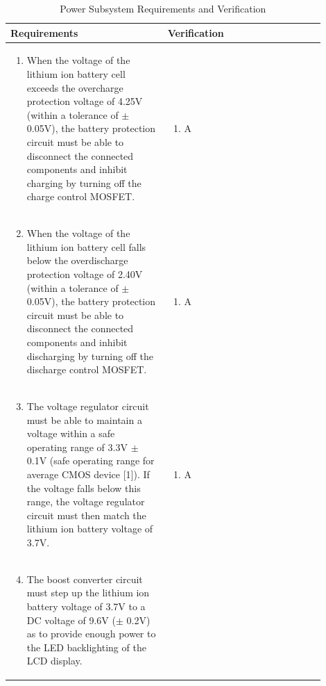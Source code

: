 \documentclass[12pt]{article}
\begin{document}
\begin{table}[!h]
	\caption{Power Subsystem Requirements and Verification}
	\label{tab:p}
	\centering
	\begin{tabular}{| p{0.45\linewidth} | p{0.45\linewidth} |} 
 		\hline
 		\textbf{Requirements} & \textbf{Verification} \\ 
 		\hline
 		\begin{enumerate}
 			\item When the voltage of the lithium ion battery cell exceeds the overcharge protection voltage of 4.25V (within a tolerance of $\pm$0.05V), the battery protection circuit must be able to disconnect the connected components and inhibit charging by turning off the charge control MOSFET. 
		\end{enumerate} & \begin{enumerate}[label=\alph*)]
 			\item A
		\end{enumerate} \\
		\hline
		\begin{enumerate}
		\setcounter{enumi}{1}
 			\item When the voltage of the lithium ion battery cell falls below the overdischarge protection voltage of 2.40V (within a tolerance of $\pm$0.05V), the battery protection circuit must be able to disconnect the connected components and inhibit discharging by turning off the discharge control MOSFET.
		\end{enumerate} & \begin{enumerate}[label=\alph*)]
 			\item A
		\end{enumerate} \\
		\hline
		\begin{enumerate}
		\setcounter{enumi}{2}
 			\item The voltage regulator circuit must be able to maintain a voltage within a safe operating range of 3.3V $\pm$ 0.1V (safe operating range for average CMOS device [1]). If the voltage falls below this range, the voltage regulator circuit must then match the lithium ion battery voltage of 3.7V. 
		\end{enumerate} & \begin{enumerate}[label=\alph*)]
 			\item A
		\end{enumerate} \\
		\hline
		\begin{enumerate}
		\setcounter{enumi}{3}
 			\item The boost converter circuit must step up the lithium ion battery voltage of 3.7V to a DC voltage of 9.6V ($\pm$ 0.2V) as to provide enough power to the LED backlighting of the LCD display.

\end{enumerate}
\end{tabular}
\end{table}
\end{document}
